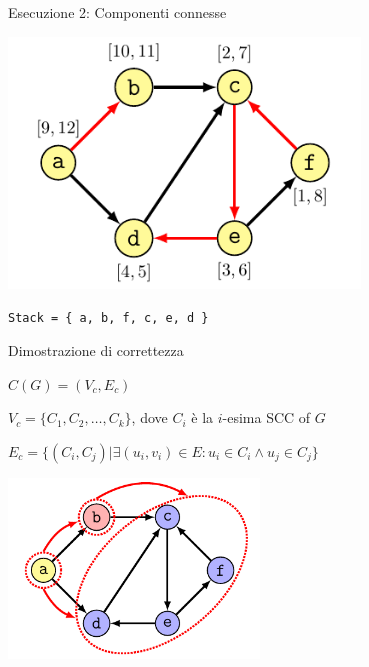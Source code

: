 \begin{frame}{Esecuzione 2: Componenti connesse}

\centering\includegraphics[width=0.7\textwidth,page=4]{scc4.pdf}

\Large
\texttt{Stack = \{ a, b, f, c, e, d \} }

\end{frame}



\begin{frame}{Dimostrazione di correttezza}

\vspace{-6pt}
\begin{myboxtitle}
$C(G) = (V_c, E_c)$
\BI
\item $V_c = \{ C_1, C_2, \ldots , C_k \}$, dove $C_i$ è la $i$-esima SCC of $G$
\item $E_c = \{ (C_i, C_j) | \exists (u_i, v_i) \in E: u_i \in C_i \wedge u_j \in C_j \}$
\EI
\end{myboxtitle}

\centering\includegraphics[width=0.5\textwidth,page=1]{scc2.pdf}
\end{frame}

